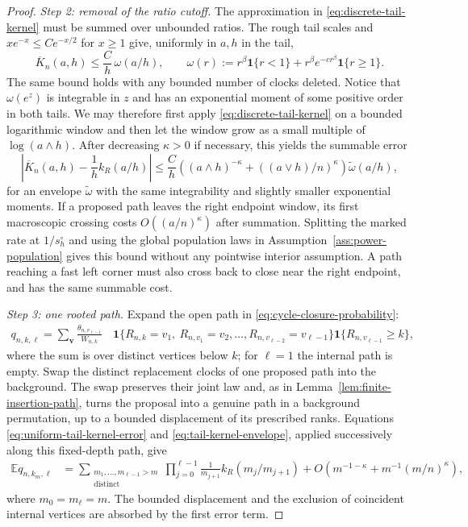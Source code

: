 \documentclass[11pt]{article}
\theoremstyle{remark}
\theoremstyle{plain}
\newcommand{\E}{\mathbb E}
\newcommand{\one}{\mathbf 1}
\begin{document}
\begin{proof}
\smallskip
\noindent\emph{Step 2: removal of the ratio cutoff.}
The approximation in \eqref{eq:discrete-tail-kernel} must be summed over
unbounded ratios.  The rough tail scales and $xe^{-x}\le Ce^{-x/2}$ for
$x\ge1$ give, uniformly in $a,h$ in the tail,
\begin{equation}\label{eq:tail-kernel-envelope}
 \overline K_n(a,h)\le\frac Ch\,\omega(a/h),\qquad
 \omega(r):=r^\beta\one\{r<1\}
       +r^\beta e^{-cr^\beta}\one\{r\ge1\}.
\end{equation}
The same bound holds with any bounded number of clocks deleted.  Notice that
$\omega(e^z)$ is integrable in $z$ and has an exponential moment of some
positive order in both tails.  We may therefore first apply
\eqref{eq:discrete-tail-kernel} on a bounded logarithmic window and then let
the window grow as a small multiple of $\log(a\wedge h)$.  After decreasing
$\kappa>0$ if necessary, this yields the summable error
\begin{equation}\label{eq:uniform-tail-kernel-error}
 \left|\overline K_n(a,h)-\frac1h k_R(a/h)\right|
 \le\frac Ch\left((a\wedge h)^{-\kappa}
        +((a\vee h)/n)^\kappa\right)\widetilde\omega(a/h),
\end{equation}
for an envelope $\widetilde\omega$ with the same integrability and slightly
smaller exponential moments.  If a proposed path leaves the right endpoint
window, its first macroscopic crossing costs $O((a/n)^\kappa)$ after
summation.  Splitting the marked rate at $1/s_h^\circ$ and using the global
population laws in Assumption~\ref{ass:power-population} gives this bound
without any pointwise interior assumption.  A path reaching a fast left
corner must also cross back to close near the right endpoint, and has the
same summable cost.

\smallskip
\noindent\emph{Step 3: one rooted path.}
Expand the open path in \eqref{eq:cycle-closure-probability}:
\begin{align}
 q_{n,k,\ell}
 =\sum_{\boldsymbol v}
 \frac{\theta_{n,v_{\ell-1}}}{W_{n,k}}\,
 &\one\{R_{n,k}=v_1,\ R_{n,v_1}=v_2,\ldots,
          R_{n,v_{\ell-2}}=v_{\ell-1}\}
 \one\{R_{n,v_{\ell-1}}\ge k\},
 \label{eq:open-path-expansion}
\end{align}
where the sum is over distinct vertices below $k$; for $\ell=1$ the internal
path is empty.  Swap the distinct replacement clocks of one proposed
path into the background.  The swap preserves their joint law and, as in
Lemma~\ref{lem:finite-insertion-path}, turns the proposal into a genuine path
in a background permutation, up to a bounded displacement of its prescribed
ranks.  Equations \eqref{eq:uniform-tail-kernel-error} and
\eqref{eq:tail-kernel-envelope}, applied successively along this fixed-depth
path, give
\begin{align}
 \E q_{n,k_m,\ell}
 &=\sum_{\substack{m_1,\ldots,m_{\ell-1}>m\\\mathrm{distinct}}}
 \prod_{j=0}^{\ell-1}
 \frac1{m_{j+1}}k_R(m_j/m_{j+1})
 +O\left(m^{-1-\kappa}+m^{-1}(m/n)^\kappa\right),
 \label{eq:discrete-rooted-trace}
\end{align}
where $m_0=m_\ell=m$.  The bounded displacement and the exclusion of
coincident internal vertices are absorbed by the first error term.


\end{proof}
\end{document}
